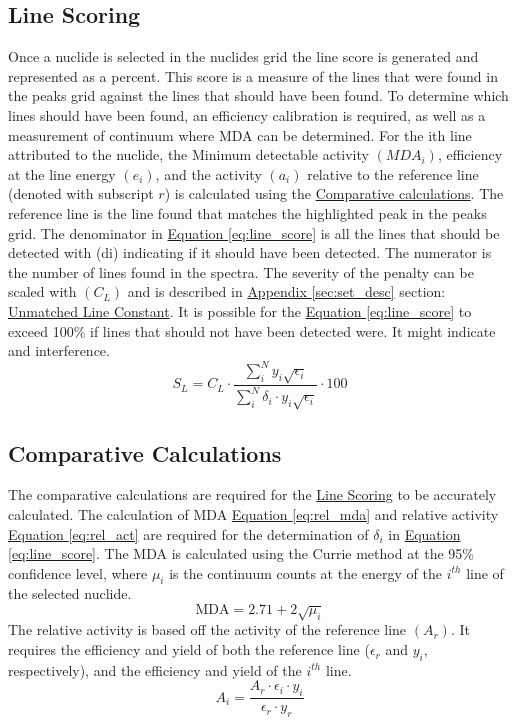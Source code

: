 \documentclass[12pt,report,justified]{SANDreport}
\begin{document}
\subsection{Line Scoring}\label{sec:ln_score}
Once a nuclide is selected in the nuclides grid the line score is generated and represented as a
percent. This score is a measure of the lines that were found in the peaks grid against the lines
that should have been found. To determine which lines should have been found, an efficiency
calibration is required, as well as a measurement of continuum where MDA can be determined.
For the ith line attributed to the nuclide, the Minimum detectable activity \( \left(MDA_i\right) \),
efficiency at
the line energy \(\left(e_i\right)\), and the activity \(\left( a_i\right)\) relative to the reference line
(denoted with subscript \(r\)) is
calculated using the \hyperref[sec:comp_calcs]{Comparative calculations}. The reference line is the line found that matches
the highlighted peak in the peaks grid. The denominator in \hyperref[eq:line_score]{Equation \ref{eq:line_score}} is all the lines that should
be detected with (di) indicating if it should have been detected. The numerator is the number of
lines found in the spectra. The severity of the penalty can be scaled with \(\left(C_L\right)\) and is described in
\hyperref[sec:set_desc]{Appendix \ref{sec:set_desc}} section: \hyperref[itm:sm_peak_pen]{Unmatched Line Constant}. It is
possible for the \hyperref[eq:line_score]{Equation \ref{eq:line_score}} to exceed 100\% if
lines that should not have been detected were. It might indicate and interference.
\begin{equation}
S_L = C_L \cdot \frac{\sum_i^N y_i \sqrt{\epsilon _i}}{\sum_i^N \delta _i \cdot y_i \sqrt{\epsilon _i}} \cdot 100
\label{eq:line_score}
\end{equation}

\subsection{Comparative Calculations}\label{sec:comp_calcs}
The comparative calculations are required for the \hyperref[sec:ln_score]{Line Scoring} to be accurately calculated. The
calculation of MDA \hyperref[eq:rel_mda]{Equation \ref{eq:rel_mda}} and relative activity \hyperref[eq:rel_act]{Equation \ref{eq:rel_act}} are required for the determination of \(\delta _i\) in \hyperref[eq:line_score]{Equation \ref{eq:line_score}}. The MDA is calculated using the Currie method at the 95\% confidence level, where \(\mu _i\) is the continuum counts at the energy of the \(i^{th}\) line of the selected nuclide.
\begin{equation}
\text{MDA} = 2.71 + 2 \sqrt{\mu _i}
\label{eq:rel_mda}
\end{equation}
The relative activity is based off the activity of the reference line \(\left(A_r\right)\). It requires the efficiency
and yield of both the reference line (\(\epsilon _r \) and  \(y_i\), respectively), and the efficiency and yield of the \(i^{th}\)
line.
\begin{equation}
A_i = \frac{A_r \cdot \epsilon _i \cdot y_i}{\epsilon _r \cdot y_r}
\label{eq:rel_act}
\end{equation}
\end{document}
